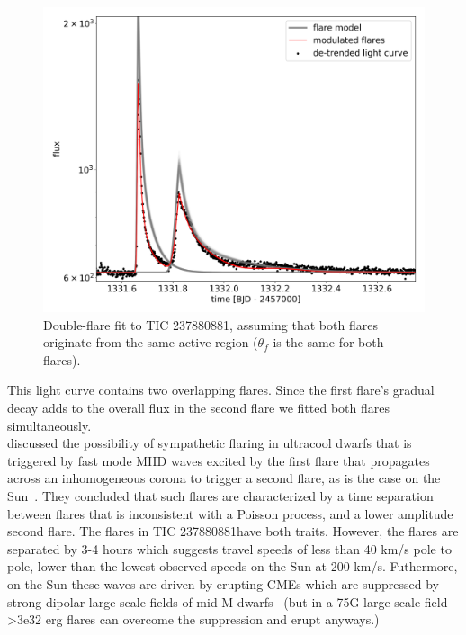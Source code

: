 \documentclass[fleqn,usenatbib,letters]{mnras}%
\newcommand{\FC}{TIC 237880881} %
\begin{document}
\begin{figure}
	\includegraphics[width=\columnwidth]{figures/23_12_2019_13_28_TIC237880881_flarefit_50retrievals.png}
    \caption{Double-flare fit to \FC, assuming that both flares originate from the same active region ($\theta_f$ is the same for both flares).}
    \label{fig:fit\FC}
\end{figure}
This light curve contains two overlapping flares. Since the first flare's gradual decay adds to the overall flux in the second flare we fitted both flares simultaneously.
\\
\citet{gizis2017b} discussed the possibility of sympathetic flaring in ultracool dwarfs that is triggered by fast mode MHD waves excited by the first flare that propagates across an inhomogeneous corona to trigger a second flare, as is the case on the Sun~\citep{uchida1968}. They concluded that such flares are characterized by a time separation between flares that is inconsistent with a Poisson process, and a lower amplitude second flare. The flares in \FC have both traits. However, the flares are separated by 3-4 hours which suggests travel speeds of less than 40 km/s pole to pole, lower than the lowest observed speeds on the Sun at 200 km/s. Futhermore, on the Sun these waves are driven by erupting CMEs which are suppressed by strong dipolar large scale fields of mid-M dwarfs~\citep{alvaradogomez2018} (but in a 75G large scale field >3e32 erg flares can overcome the suppression and erupt anyways.)
\end{document}
